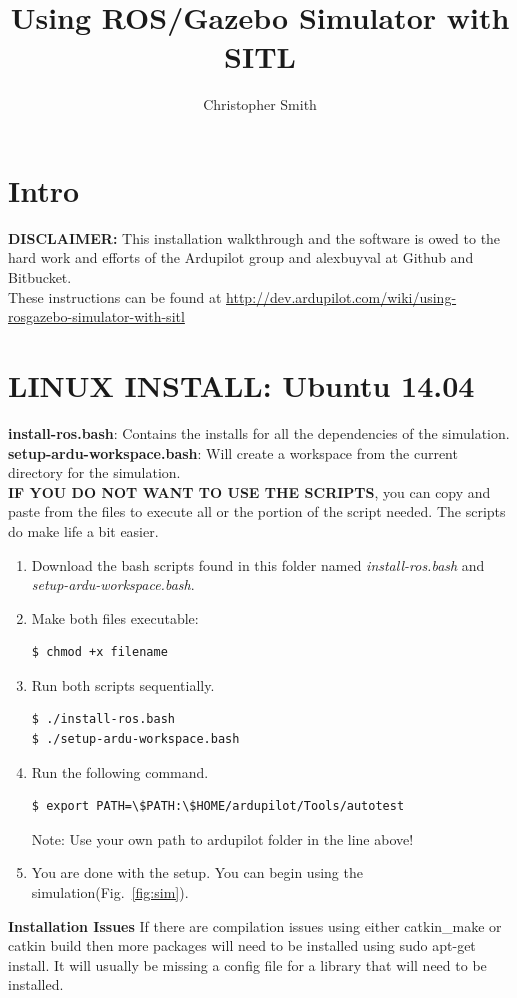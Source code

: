 \documentclass[10pt,a4paper,notitlepage]{report}
\author{Christopher Smith}
\title{Using ROS/Gazebo Simulator with SITL}
\begin{document}
\maketitle
\section*{Intro}
\noindent \textbf{DISCLAIMER:} This installation walkthrough and the software is owed to the hard work and efforts of the Ardupilot group and alexbuyval at Github and Bitbucket.\\

\noindent These instructions can be found at \hspace{2mm} \url{http://dev.ardupilot.com/wiki/using-rosgazebo-simulator-with-sitl}\\

\section*{LINUX INSTALL: Ubuntu 14.04}

\noindent \textbf{install-ros.bash}: Contains the installs for all the dependencies of the simulation.\\
\noindent \textbf{setup-ardu-workspace.bash}: Will create a workspace from the current directory for the simulation.\\

\noindent \textbf{IF YOU DO NOT WANT TO USE THE SCRIPTS}, you can copy and paste from the files to execute all or the portion of the script needed. The scripts do make life a bit easier.\\
\begin{enumerate}
\item Download the bash scripts found in this folder named \textit{install-ros.bash} and \textit{setup-ardu-workspace.bash}.
\item Make both files executable:
\begin{lstlisting}[language=bash]
$ chmod +x filename
\end{lstlisting}
\item Run both scripts sequentially. 
\begin{lstlisting}[language=bash]
$ ./install-ros.bash
$ ./setup-ardu-workspace.bash
\end{lstlisting}
\item Run the following command.
\begin{lstlisting}[language=bash]
$ export PATH=\$PATH:\$HOME/ardupilot/Tools/autotest 
\end{lstlisting}
Note: Use your own path to ardupilot folder in the line above!
\item You are done with the setup. You can begin using the simulation(Fig.~\ref{fig:sim}).
\end{enumerate}
\noindent \textbf{Installation Issues} If there are compilation issues using either catkin_make or catkin build then more packages will need to be installed using sudo apt-get install. It will usually be missing a config file for a library that will need to be installed.
\end{document}
